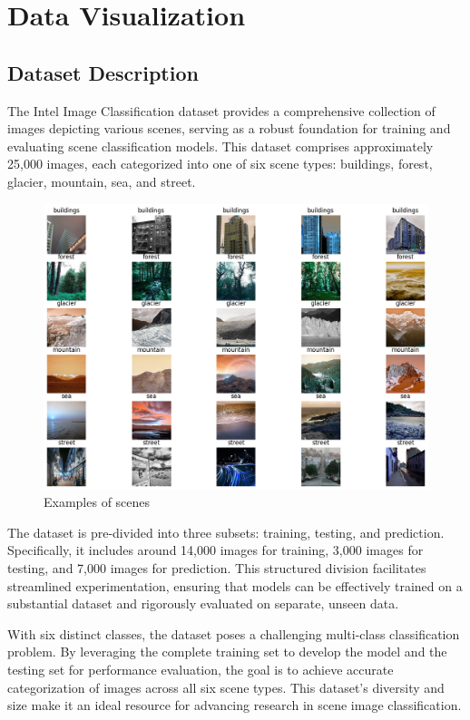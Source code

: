 \section{Data Visualization}
\label{sec:Data Visualization}
\subsection{Dataset Description}
The Intel Image Classification dataset provides a comprehensive collection of images depicting various scenes, serving as a robust foundation for training and evaluating scene classification models. This dataset comprises approximately 25,000 images, each categorized into one of six scene types: buildings, forest, glacier, mountain, sea, and street.

\begin{figure}[h!]
    \centering
    \includegraphics[width=1\linewidth]{images/conjunto_dados.png}
    \caption{Examples of scenes}
    \label{fig:Examples-of-scenes}
\end{figure}

The dataset is pre-divided into three subsets: training, testing, and prediction. Specifically, it includes around 14,000 images for training, 3,000 images for testing, and 7,000 images for prediction. This structured division facilitates streamlined experimentation, ensuring that models can be effectively trained on a substantial dataset and rigorously evaluated on separate, unseen data.

With six distinct classes, the dataset poses a challenging multi-class classification problem. By leveraging the complete training set to develop the model and the testing set for performance evaluation, the goal is to achieve accurate categorization of images across all six scene types. This dataset's diversity and size make it an ideal resource for advancing research in scene image classification.

